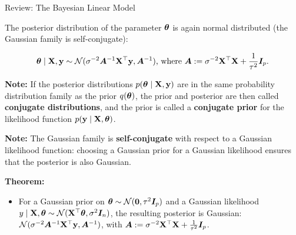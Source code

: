 \begin{frame}[c, allowframebreaks]{Review: The Bayesian Linear Model}
\framebreak

The posterior distribution of the parameter $\bm{\theta}$ is again normal distributed (the Gaussian family is self-conjugate): 

$$
\bm{\theta} \mid \mathbf{X}, \mathbf{y} \sim \mathcal{N}(\sigma^{-2}\bm{A}^{-1}\mathbf{X}^\top\mathbf{y}, \bm{A}^{-1})\text{, where }\bm{A}:= \sigma^{-2}\mathbf{X}^\top\mathbf{X} + \frac{1}{\tau^2} \boldsymbol{I}_p.
$$


\lz 

\begin{footnotesize}
\textbf{Note:} If the posterior distributions $p(\bm{\theta}\mid\mathbf{X}, \mathbf{y})$ are in the same probability distribution family as the prior $q(\bm{\theta})$, the prior and posterior are then called \textbf{conjugate distributions}, and the prior is  called a \textbf{conjugate prior} for the likelihood function $p(\mathbf{y}\mid\mathbf{X}, \bm{\theta})$. 
\end{footnotesize}

\lz

\begin{footnotesize}
\textbf{Note:} The Gaussian family is \textbf{self-conjugate} with respect to a Gaussian likelihood function: choosing a Gaussian prior for a Gaussian likelihood ensures that the posterior is also Gaussian.
\end{footnotesize}


\framebreak



\framebreak



\framebreak


\begin{footnotesize}
\textbf{Theorem:}\\
\begin{itemize}
  \item For a Gaussian prior on $\bm{\theta} \sim \mathcal{N}(\mathbf{0}, \tau^2 \boldsymbol{I}_p)$ and a Gaussian likelihood $y \mid \mathbf{X}, \bm{\theta} \sim \mathcal{N}(\mathbf{X}^\top \bm{\theta}, \sigma^2 \boldsymbol{I}_n)$, the resulting posterior is Gaussian: $\mathcal{N}(\sigma^{-2}\bm{A}^{-1}\mathbf{X}^\top\mathbf{y}, \bm{A}^{-1})$, with $\bm{A}:= \sigma^{-2}\mathbf{X}^\top\mathbf{X} + \frac{1}{\tau^2} \boldsymbol{I}_p$.
  \end{itemize}


\end{footnotesize}
\end{frame}
